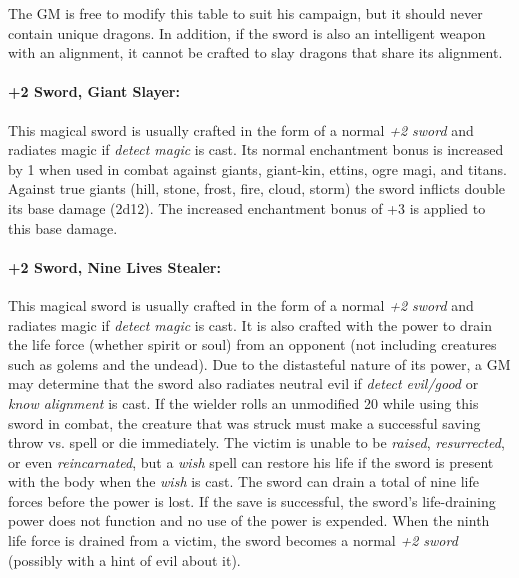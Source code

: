 \begin{multicols}{2}
The GM is free to modify this table to suit his campaign, but it should never contain unique dragons. In addition, if the sword is also an intelligent weapon with an alignment, it cannot be crafted to slay dragons that share its alignment.

\paragraph{+2 Sword, Giant Slayer:} This magical sword is usually crafted in the form of a normal \textit{+2 sword} and radiates magic if \textit{detect magic} is cast.  Its normal enchantment bonus is increased by 1 when used in combat against giants, giant-kin, ettins, ogre magi, and titans.  Against true giants (hill, stone, frost, fire, cloud, storm) the sword inflicts double its base damage (2d12).  The increased enchantment bonus of +3 is applied to this base damage.

\paragraph{+2 Sword, Nine Lives Stealer:} This magical sword is usually crafted in the form of a normal \textit{+2 sword} and radiates magic if \textit{detect magic} is cast.  It is also crafted with the power to drain the life force (whether spirit or soul) from an opponent (not including creatures such as golems and the undead).  Due to the distasteful nature of its power, a GM may determine that the sword also radiates neutral evil if \textit{detect evil/good} or \textit{know alignment} is cast.  If the wielder rolls an unmodified 20 while using this sword in combat, the creature that was struck must make a successful saving throw vs. spell or die immediately.  The victim is unable to be \textit{raised}, \textit{resurrected}, or even \textit{reincarnated}, but a \textit{wish} spell can restore his life if the sword is present with the body when the \textit{wish} is cast.  The sword can drain a total of nine life forces before the power is lost.  If the save is successful, the sword's life-draining power does not function and no use of the power is expended.  When the ninth life force is drained from a victim, the sword becomes a normal \textit{+2 sword} (possibly with a hint of evil about it).


\end{multicols}
